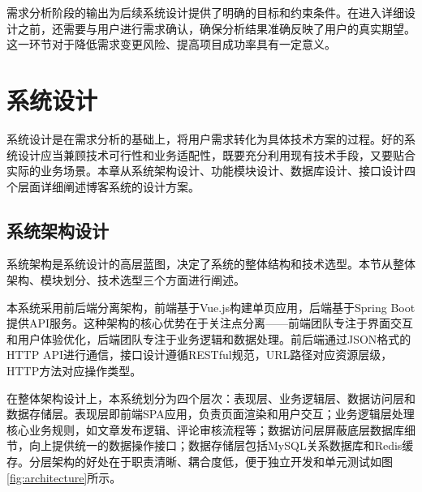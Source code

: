 \documentclass[UTF8,AutoFakeBold=1,AutoFakeSlant,zihao=-4]{SCAU}
\begin{document}
 需求分析阶段的输出为后续系统设计提供了明确的目标和约束条件。在进入详细设计之前，还需要与用户进行需求确认，确保分析结果准确反映了用户的真实期望。这一环节对于降低需求变更风险、提高项目成功率具有一定意义。

 \section{系统设计}

 系统设计是在需求分析的基础上，将用户需求转化为具体技术方案的过程。好的系统设计应当兼顾技术可行性和业务适配性，既要充分利用现有技术手段，又要贴合实际的业务场景{\citep{冯岩2018}}。本章从系统架构设计、功能模块设计、数据库设计、接口设计四个层面详细阐述博客系统的设计方案。

 \subsection{系统架构设计}

 系统架构是系统设计的高层蓝图，决定了系统的整体结构和技术选型。本节从整体架构、模块划分、技术选型三个方面进行阐述。

 本系统采用前后端分离架构，前端基于Vue.js构建单页应用，后端基于Spring Boot提供API服务{\citep{Yi2020}}。这种架构的核心优势在于关注点分离——前端团队专注于界面交互和用户体验优化，后端团队专注于业务逻辑和数据处理。前后端通过JSON格式的HTTP API进行通信，接口设计遵循RESTful规范，URL路径对应资源层级，HTTP方法对应操作类型。

 在整体架构设计上，本系统划分为四个层次：表现层、业务逻辑层、数据访问层和数据存储层。表现层即前端SPA应用，负责页面渲染和用户交互；业务逻辑层处理核心业务规则，如文章发布逻辑、评论审核流程等；数据访问层屏蔽底层数据库细节，向上提供统一的数据操作接口；数据存储层包括MySQL关系数据库和Redis缓存。分层架构的好处在于职责清晰、耦合度低，便于独立开发和单元测试如图\ref{fig:architecture}所示。
\end{document}
